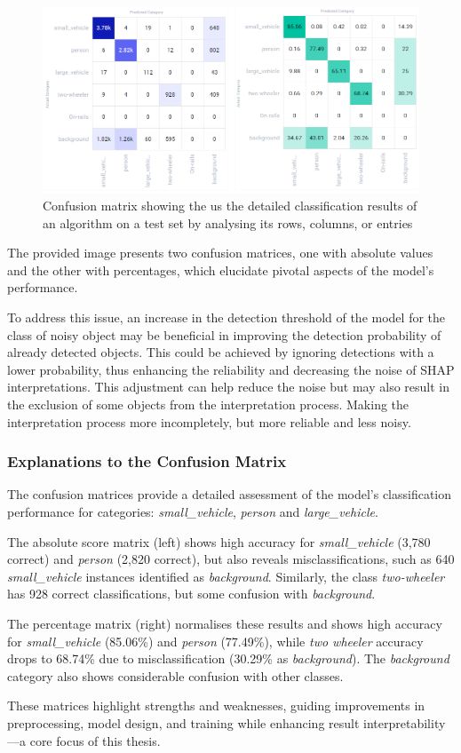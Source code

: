 \begin{figure}
    \centering
    \includegraphics[width=1\linewidth]{figures/confusion_matrix2}
    \caption{Confusion matrix showing the us the detailed classification results of an algorithm on a test set by analysing its rows, columns, or entries}
    \label{fig:Confusionmatrix}
\end{figure}

The provided image presents two confusion matrices, one with absolute values and the other with percentages, which elucidate pivotal aspects of the model's performance.

To address this issue, an increase in the detection threshold of the model for the class of noisy object  may be beneficial in improving the detection probability of already detected objects.
This could be achieved by ignoring detections with a lower probability, thus enhancing the reliability and decreasing the noise
of SHAP interpretations.
This adjustment can help reduce the noise but may also result in the exclusion of some objects from the interpretation process.
Making the interpretation process more incompletely, but more reliable and less noisy.

\subsubsection{Explanations to the Confusion Matrix}
The confusion matrices provide a detailed assessment of the model's classification performance for categories: \textit{small\_vehicle}, \textit{person} and \textit{large\_vehicle}.

The absolute score matrix (left) shows high accuracy for \textit{small\_vehicle} (3,780 correct) and \textit{person} (2,820 correct), but also reveals misclassifications, such as 640 \textit{small\_vehicle} instances identified as \textit{background}. Similarly, the class \textit{two-wheeler} has 928 correct classifications, but some confusion with \textit{background}.

The percentage matrix (right) normalises these results and shows high accuracy for \textit{small\_vehicle} (85.06\%) and \textit{person} (77.49\%), while \textit{two wheeler} accuracy drops to 68.74\% due to misclassification (30.29\% as \textit{background}). The \textit{background} category also shows considerable confusion with other classes.

These matrices highlight strengths and weaknesses, guiding improvements in preprocessing, model design, and training while enhancing result interpretability—a core focus of this thesis.
\newpage


